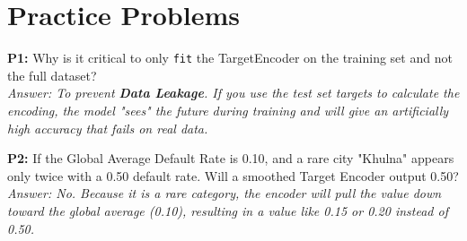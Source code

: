 \documentclass{article}
\begin{document}
\section{Practice Problems}
\textbf{P1:} Why is it critical to only \texttt{fit} the TargetEncoder on the training set and not the full dataset? \\
\textit{Answer: To prevent \textbf{Data Leakage}. If you use the test set targets to calculate the encoding, the model "sees" the future during training and will give an artificially high accuracy that fails on real data.}

\textbf{P2:} If the Global Average Default Rate is 0.10, and a rare city "Khulna" appears only twice with a 0.50 default rate. Will a smoothed Target Encoder output 0.50? \\
\textit{Answer: No. Because it is a rare category, the encoder will pull the value down toward the global average (0.10), resulting in a value like 0.15 or 0.20 instead of 0.50.}
\end{document}
